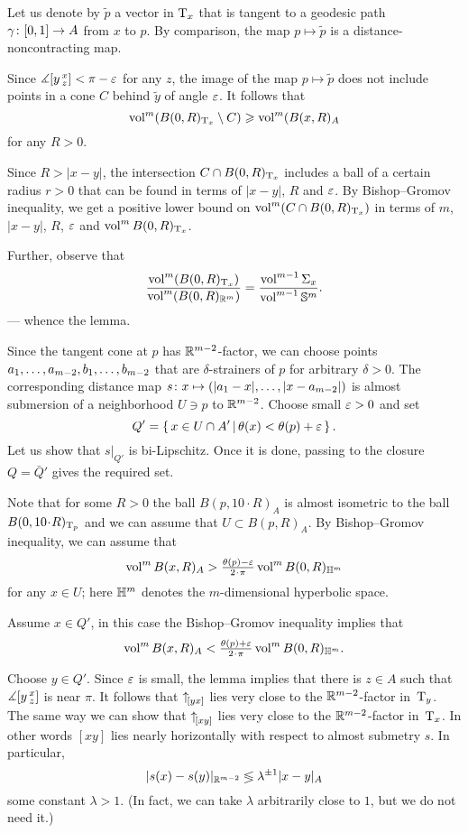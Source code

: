 Let us denote by $\tilde p$ a vector in $\mathrm{T}_x$ that is tangent to a geodesic path $\gamma\:[0,1]\zz\to A$ from $x$ to $p$.
By comparison, the map $p\mapsto \tilde p$ is a distance-noncontracting map.


Since $\measuredangle[y\,{}^{x}_{z}]<\pi-\varepsilon$ for any $z$, the image of the map $p\mapsto \tilde p$ does not include points in a cone $C$ behind $\tilde y$ of angle $\varepsilon$.
It follows that 
\[\operatorname{vol}^m(B(0,R)_{\mathrm{T}_x}\setminus C)\geqslant \operatorname{vol}^m(B(x,R)_A\]
for any $R>0$.

Since $R>|x-y|$, the intersection $C\zz\cap B(0,R)_{\T_x}$ includes a ball of a certain radius $r>0$ that can be found in terms of $|x-y|$, $R$ and $\varepsilon$.
By Bishop--Gromov inequality, we get a positive lower bound on $\operatorname{vol}^m(C\cap B(0,R)_{\mathrm{T}_x})$ in terms of $m$, $|x-y|$, $R$, $\varepsilon$ and $\operatorname{vol}^mB(0,R)_{\mathrm{T}_x}$.

Further, observe that 
\[\frac{\operatorname{vol}^m(B(0,R)_{\mathrm{T}_x})}{\operatorname{vol}^m(B(0,R)_{\mathbb{R}^m})}
=
\frac{\operatorname{vol}^{m-1} \Sigma_x}{\operatorname{vol}^{m-1} \mathbb{S}^m}.
\]
--- whence the lemma.
\qeds







Since the tangent cone at $p$ has $\mathbb{R}^{m-2}$-factor, 
we can choose points $a_1,\zz\dots,a_{m-2},b_1,\zz\dots,b_{m-2}$ that are $\delta$-strainers of $p$ for arbitrary $\delta>0$.
The corresponding distance map $s\:x\zz\mapsto (|a_1-x|,\zz\dots,|x-a_{m-2}|)$ is almost submersion of a neighborhood $U\ni p$ to $\mathbb{R}^{m-2}$.
Choose small $\varepsilon>0$ and set 
\[Q'=\left\{\,x\in U\cap A'\,\middle|\,\theta(x)<\theta(p)+\varepsilon\,\right\}.\]
Let us show that $s|_{Q'}$ is bi-Lipschitz.
Once it is done, passing to the closure $Q=\bar Q'$ gives the required set. 

Note that for some $R>0$ the ball $B(p,10\cdot R)_A$ is almost isometric to the ball $B(0,10\cdot R)_{\T_p}$
and we can assume that $U\subset B(p,R)_A$.
By Bishop--Gromov inequality, we can assume that 
\[\vol^m B(x,R)_A>\tfrac{\theta(p)-\eps}{2\cdot \pi}\vol^m B(0,R)_{\HH^m}\]
for any $x\in U$; here $\mathbb{H}^m$ denotes the $m$-dimensional hyperbolic space. 

Assume $x\in Q'$, in this case the Bishop--Gromov inequality implies that 
\[\vol^m B(x,R)_A< \tfrac{\theta(p)+\eps}{2\cdot \pi}\vol^m B(0,R)_{\HH^m}.\]

Choose $y\in Q'$.
Since $\varepsilon$ is small, the lemma implies that there is $z\in A$ such that $\measuredangle[y\,{}^{x}_{z}]$ is near $\pi$.
It follows that ${\uparrow}_{\hskip-0.15em[{y}{x}]}$ lies very close to the $\mathbb{R}^{m-2}$-factor in~$\mathrm{T}_y$.
The same way we can show that ${\uparrow}_{\hskip-0.15em[{x}{y}]}$ lies very close to the $\mathbb{R}^{m-2}$-factor in~$\mathrm{T}_x$.
In other words $[xy]$ lies nearly horizontally with respect to almost submetry $s$.
In particular,  
\[|s(x)-s(y)|_{\mathbb{R}^{m-2}} \lessgtr \lambda^{\pm1}|x-y|_{A}\]
some constant $\lambda>1$.
(In fact, we can take $\lambda$ arbitrarily close to $1$, but we do not need it.)
\qeds
